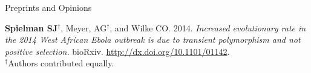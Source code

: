 \documentclass{resume} %
\begin{document}
\vspace*{0.5cm}
\begin{rSection}{Preprints and Opinions}
\vspace*{0.25cm}

\begin{etaremune}[leftmargin=1.5em]

\item \textbf{Spielman SJ}$^\dagger$, Meyer, AG$^\dagger$, and Wilke CO. 2014. \emph{Increased evolutionary rate in the 2014 West African Ebola outbreak is due to transient polymorphism and not
positive selection.} bioRxiv. \href{http://dx.doi.org/10.1101/01142}{http://dx.doi.org/10.1101/01142}.
\\\noindent$^\dagger$Authors contributed equally.

\end{etaremune}


\end{rSection}



\end{document}
